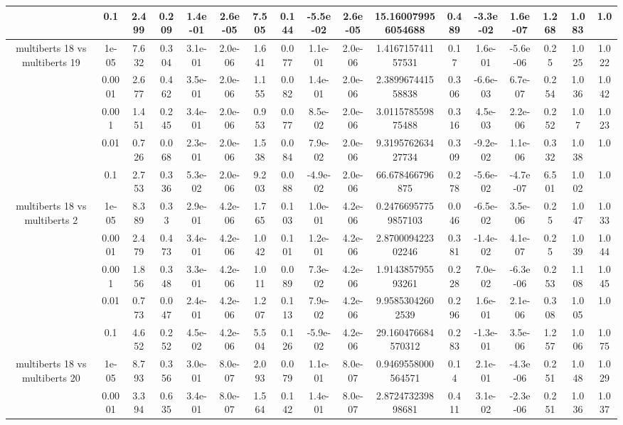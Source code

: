 \begin{tabular}{|c|c|c|c|c|c|c|c|c|c|c|c|c|c|c|c|c|}
 & 0.1 & 2.499 & 0.209 & 1.4e-01 & 2.6e-05 & 7.505 & 0.144 & -5.5e-02 & 2.6e-05 & 15.160079956054688 & 0.489 & -3.3e-02 & 1.6e-07 & 1.268 & 1.083 & 1.0 \\
\hline
\multirow{5}{*}{multiberts 18 vs multiberts 19} & 1e-05 & 7.632 & 0.304 & 3.1e-01 & 2.0e-06 & 1.641 & 0.077 & 1.1e-01 & 2.0e-06 & 1.416715741157531 & 0.17 & 1.6e-01 & -5.6e-06 & 0.25 & 1.025 & 1.022 \\
 & 0.0001 & 2.677 & 0.462 & 3.5e-01 & 2.0e-06 & 1.155 & 0.082 & 1.4e-01 & 2.0e-06 & 2.389967441558838 & 0.306 & -6.6e-03 & 6.7e-07 & 0.254 & 1.036 & 1.042 \\
 & 0.001 & 1.451 & 0.245 & 3.4e-01 & 2.0e-06 & 0.953 & 0.077 & 8.5e-02 & 2.0e-06 & 3.011578559875488 & 0.316 & 4.5e-03 & 2.2e-06 & 0.252 & 1.07 & 1.023 \\
 & 0.01 & 0.726 & 0.068 & 2.3e-01 & 2.0e-06 & 1.538 & 0.084 & 7.9e-02 & 2.0e-06 & 9.319576263427734 & 0.309 & -9.2e-02 & 1.1e-06 & 0.332 & 1.038 & 1.0 \\
 & 0.1 & 2.753 & 0.336 & 5.3e-02 & 2.0e-06 & 9.203 & 0.088 & -4.9e-02 & 2.0e-06 & 66.678466796875 & 0.278 & -5.6e-02 & -4.7e-07 & 6.501 & 1.002 & 1.0 \\
\hline
\multirow{5}{*}{multiberts 18 vs multiberts 2} & 1e-05 & 8.389 & 0.33 & 2.9e-01 & 4.2e-06 & 1.765 & 0.103 & 1.0e-01 & 4.2e-06 & 0.24766957759857103 & 0.046 & -6.5e-02 & 3.5e-06 & 0.25 & 1.047 & 1.033 \\
 & 0.0001 & 2.479 & 0.473 & 3.4e-01 & 4.2e-06 & 1.042 & 0.101 & 1.2e-01 & 4.2e-06 & 2.870009422302246 & 0.381 & -1.4e-02 & 4.1e-07 & 0.25 & 1.039 & 1.044 \\
 & 0.001 & 1.856 & 0.348 & 3.3e-01 & 4.2e-06 & 1.011 & 0.089 & 7.3e-02 & 4.2e-06 & 1.914385795593261 & 0.228 & 7.0e-02 & -6.3e-06 & 0.253 & 1.108 & 1.045 \\
 & 0.01 & 0.773 & 0.047 & 2.4e-01 & 4.2e-06 & 1.207 & 0.113 & 7.9e-02 & 4.2e-06 & 9.95853042602539 & 0.296 & 1.6e-01 & 2.1e-06 & 0.308 & 1.005 & 1.0 \\
 & 0.1 & 4.652 & 0.252 & 4.5e-02 & 4.2e-06 & 5.504 & 0.126 & -5.9e-02 & 4.2e-06 & 29.160476684570312 & 0.283 & -1.3e-01 & 3.5e-06 & 1.257 & 1.006 & 1.075 \\
\hline
\multirow{5}{*}{multiberts 18 vs multiberts 20} & 1e-05 & 8.793 & 0.356 & 3.0e-01 & 8.0e-07 & 2.093 & 0.079 & 1.1e-01 & 8.0e-07 & 0.9469558000564571 & 0.14 & 2.1e-01 & -4.3e-06 & 0.251 & 1.048 & 1.029 \\
 & 0.0001 & 3.394 & 0.635 & 3.4e-01 & 8.0e-07 & 1.564 & 0.142 & 1.4e-01 & 8.0e-07 & 2.872473239898681 & 0.411 & 3.1e-02 & -2.3e-06 & 0.251 & 1.036 & 1.037 \\

\end{tabular}
